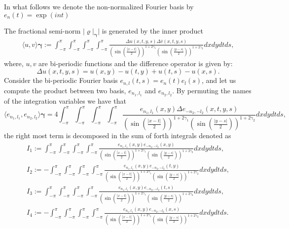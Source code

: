 \documentclass{article}
\begin{document}
In what follows we denote the non-normalized Fourier basis by $e_n(t) = \exp{(i n t) }$

The fractional semi-norm $|\varrho|_{\mathbf{\gamma}}|$ is generated by the inner product 
\begin{align*}
\langle u , v \rangle{\mathbf{\gamma}} := \int_{-\pi}^{\pi}  \int_{-\pi}^{\pi} \int_{-\pi}^{\pi}\int_{-\pi}^{\pi} \frac{\Delta u (x,t,y,s)\Delta \overline{v} (x,t,y,s) }
{\left(\sin\left(\frac{|x-t|}{2}\right)\right)^{1+2\gamma_1}\left(\sin\left(\frac{|y-s|}{2}\right)\right)^{1+2\gamma_2}}dx dy dt ds, 
\end{align*}
where, $u,v$ are bi-periodic functions and the difference operator is given by:
$$\Delta u(x,t,y,s) = u(x,y)-u(t,y)+u(t,s)-u(x,s).$$
Consider the bi-periodic Fourier basis 
$e_{n,l}(t,s) = e_n(t)e_l(s)$, and let us compute the product between two basis, $e_{n_1,l_1}$ and $e_{n_2,l_2}$.  By permuting the names of the integration variables we have that 
$$\langle e_{n_1,l_1} , e_{n_2,l_2} \rangle{\mathbf{\gamma}}  =
4 \int_{-\pi}^{\pi}  \int_{-\pi}^{\pi} \int_{-\pi}^{\pi}\int_{-\pi}^{\pi} \frac{e_{n_1,l_1}(x,y)\Delta e_{-n_2,-l_2} (x,t,y,s) }
{\left(\sin\left(\frac{|x-t|}{2}\right)\right)^{1+2\gamma_1}\left(\sin\left(\frac{|y-s|}{2}\right)\right)^{1+2\gamma_2}}dx dy dt ds, 
$$
the right most term is decomposed in the sum of forth integrals denoted as
\begin{align*}
I_1 := \int_{-\pi}^{\pi}\int_{-\pi}^{\pi} \int_{-\pi}^{\pi}\int_{-\pi}^{\pi} \frac{e_{n_1,l_1}(x,y)e_{-n_2,-l_2} (x,y) }
{\left(\sin\left(\frac{|x-t|}{2}\right)\right)^{1+2\gamma_1}\left(\sin\left(\frac{|y-s|}{2}\right)\right)^{1+2\gamma_2}}dx dy dt ds,\\
I_2 :=  -\int_{-\pi}^{\pi}\int_{-\pi}^{\pi} \int_{-\pi}^{\pi}\int_{-\pi}^{\pi} \frac{e_{n_1,l_1}(x,y)e_{-n_2,-l_2} (t,y) }
{\left(\sin\left(\frac{|x-t|}{2}\right)\right)^{1+2\gamma_1}\left(\sin\left(\frac{|y-s|}{2}\right)\right)^{1+2\gamma_2}}dx dy dt ds,\\
I_3 := \int_{-\pi}^{\pi}\int_{-\pi}^{\pi} \int_{-\pi}^{\pi}\int_{-\pi}^{\pi} \frac{e_{n_1,l_1}(x,y)e_{-n_2,-l_2} (t,s) }
{\left(\sin\left(\frac{|x-t|}{2}\right)\right)^{1+2\gamma_1}\left(\sin\left(\frac{|y-s|}{2}\right)\right)^{1+2\gamma_2}}dx dy dt ds,\\
I_4 := -\int_{-\pi}^{\pi}\int_{-\pi}^{\pi} \int_{-\pi}^{\pi}\int_{-\pi}^{\pi} \frac{e_{n_1,l_1}(x,y)e_{-n_2,-l_2} (x,s) }
{\left(\sin\left(\frac{|x-t|}{2}\right)\right)^{1+2\gamma_1}\left(\sin\left(\frac{|y-s|}{2}\right)\right)^{1+2\gamma_2}}dx dy dt ds.
\end{align*}
\end{document}
